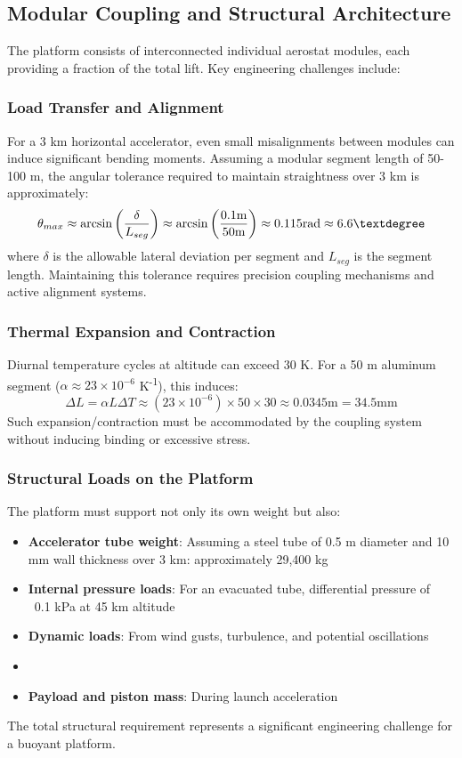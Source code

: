 \subsection{Modular Coupling and Structural Architecture}
The platform consists of interconnected individual aerostat modules, each providing a fraction of the total lift. Key engineering challenges include:

\subsubsection{Load Transfer and Alignment}
For a 3 km horizontal accelerator, even small misalignments between modules can induce significant bending moments. Assuming a modular segment length of 50-100 m, the angular tolerance required to maintain straightness over 3 km is approximately:
\begin{equation}
\theta_{max} \approx \arcsin\left(\frac{\delta}{L_{seg}}\right) \approx \arcsin\left(\frac{0.1  \text{m}}{50  \text{m}}\right) \approx 0.115  \text{rad} \approx 6.6\textdegree
\end{equation}
where $\delta$ is the allowable lateral deviation per segment and $L_{seg}$ is the segment length. Maintaining this tolerance requires precision coupling mechanisms and active alignment systems.

\subsubsection{Thermal Expansion and Contraction}
Diurnal temperature cycles at altitude can exceed 30 K. For a 50 m aluminum segment ($\alpha \approx 23 \times 10^{-6}$ K\textsuperscript{-1}), this induces:
\begin{equation}
\Delta L = \alpha L \Delta T \approx (23 \times 10^{-6}) \times 50 \times 30 \approx 0.0345  \text{m} = 34.5  \text{mm}
\end{equation}
Such expansion/contraction must be accommodated by the coupling system without inducing binding or excessive stress.

\subsubsection{Structural Loads on the Platform}
The platform must support not only its own weight but also:
\begin{itemize}
    \item \textbf{Accelerator tube weight}: Assuming a steel tube of 0.5 m diameter and 10 mm wall thickness over 3 km: approximately 29,400 kg
    \item \textbf{Internal pressure loads}: For an evacuated tube, differential pressure of ~0.1 kPa at 45 km altitude
    \item \textbf{Dynamic loads}: From wind gusts, turbulence, and potential oscillations
    \item \item \textbf{Payload and piston mass}: During launch acceleration
\end{itemize}
The total structural requirement represents a significant engineering challenge for a buoyant platform.


